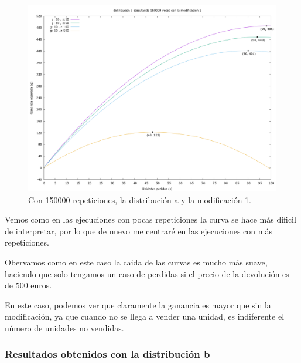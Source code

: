 \documentclass[12pt, spanish]{article}
\begin{document}
\begin{figure}[H]
	\centering
	\includegraphics[scale = 0.2]{prob_a/datos_a_150000_1.png}
	\caption{Con 150000 repeticiones, la distribución a y la modificación 1.}
	\label{fig:ej1_a_150000}

\end{figure}


Vemos como en las ejecuciones con pocas repeticiones la curva se hace más dificil de interpretar, por lo que de nuevo me centraré en las ejecuciones con más repeticiones.

Obervamos como en este caso la caida de las curvas es mucho más suave, haciendo que solo tengamos un caso de perdidas si el precio de la devolución es de 500 euros.

En este caso, podemos ver que claramente la ganancia es mayor que sin la modificación, ya que cuando no se llega a vender una unidad, es indiferente el número de unidades no vendidas.



\subsubsection{Resultados obtenidos con la distribución b}
\end{document}
